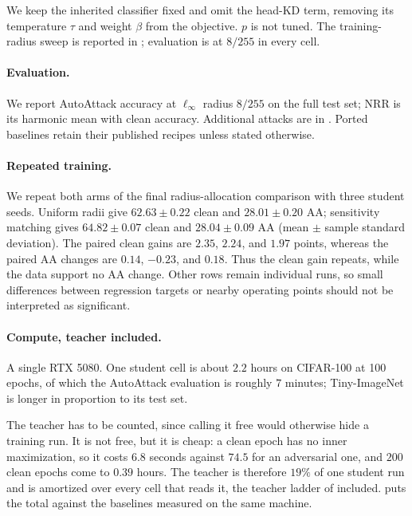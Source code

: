 We keep the inherited classifier fixed and omit the head-KD term, removing its temperature $\tau$
and weight $\beta$ from the objective. $p$ is not tuned. The training-radius sweep is reported in
; evaluation is at $8/255$ in every cell.

\paragraph{Evaluation.} We report AutoAttack accuracy at $\ell_\infty$ radius $8/255$ on the full
test set; NRR is its harmonic mean with clean accuracy. Additional attacks are in
. Ported baselines retain their published recipes unless stated
otherwise.

\paragraph{Repeated training.} We repeat both arms of the final radius-allocation comparison with
three student seeds. Uniform radii give $62.63\pm0.22$ clean and $28.01\pm0.20$ AA; sensitivity
matching gives $64.82\pm0.07$ clean and $28.04\pm0.09$ AA (mean $\pm$ sample standard deviation).
The paired clean gains are $2.35$, $2.24$, and $1.97$ points, whereas the paired AA changes are
$0.14$, $-0.23$, and $0.18$. Thus the clean gain repeats, while the data support no AA change.
Other rows remain individual runs, so small differences between regression targets or nearby
operating points should not be interpreted as significant.

\paragraph{Compute, teacher included.} A single RTX 5080. One student cell is about $2.2$ hours on
CIFAR-100 at 100 epochs, of which the AutoAttack evaluation is roughly $7$ minutes; Tiny-ImageNet is
longer in proportion to its test set.

The teacher has to be counted, since calling it free would otherwise hide a training run. It is not
free, but it is cheap: a clean epoch has no inner maximization, so it costs $6.8$ seconds against
$74.5$ for an adversarial one, and $200$ clean epochs come to $0.39$ hours. The teacher is therefore
$19\%$ of one student run and is amortized over every cell that reads it, the teacher ladder of
 included.  puts the total against the baselines measured
on the same machine.

